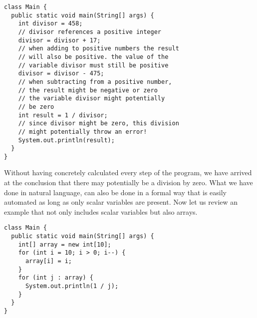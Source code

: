 \vspace{2mm}

\begin{adjustbox}{center}
\begin{lstlisting}
class Main {
  public static void main(String[] args) {
    int divisor = 458;
    // divisor references a positive integer
    divisor = divisor + 17;
    // when adding to positive numbers the result
    // will also be positive. the value of the 
    // variable divisor must still be positive
    divisor = divisor - 475;
    // when subtracting from a positive number,
    // the result might be negative or zero
    // the variable divisor might potentially
    // be zero
    int result = 1 / divisor;
    // since divisor might be zero, this division 
    // might potentially throw an error!
    System.out.println(result);
  }
}
\end{lstlisting}
\end{adjustbox}
\vspace{2mm}

\noindent Without having concretely calculated every step of the program, we have arrived at the conclusion that there may potentially be a division by zero. What we have done in natural language, can also be done in a formal way that is easily automated \cite{cousot1977} as long as only scalar variables are present. Now let us review an example that not only includes scalar variables but also arrays.


\vspace{2mm}

\begin{adjustbox}{center}
\begin{lstlisting}
class Main {
  public static void main(String[] args) {
    int[] array = new int[10];
    for (int i = 10; i > 0; i--) {
      array[i] = i;
    }
    for (int j : array) {
      System.out.println(1 / j);
    }
  }
}
\end{lstlisting}
\end{adjustbox}
\vspace{2mm}


